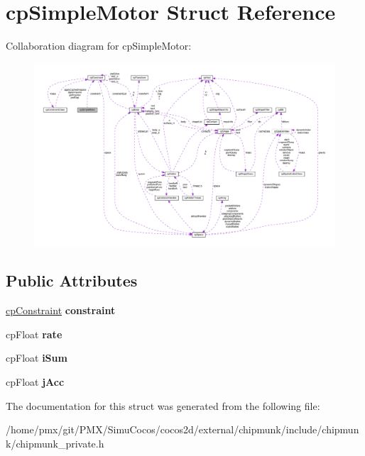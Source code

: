 \hypertarget{structcpSimpleMotor}{}\section{cp\+Simple\+Motor Struct Reference}
\label{structcpSimpleMotor}


Collaboration diagram for cp\+Simple\+Motor\+:
\nopagebreak
\begin{figure}[H]
\begin{center}
\leavevmode
\includegraphics[width=350pt]{structcpSimpleMotor__coll__graph}
\end{center}
\end{figure}
\subsection*{Public Attributes}
\begin{DoxyCompactItemize}
\item 
\mbox{\label{structcpSimpleMotor_a361cbe14d173459992b77702f9a94310}} 
\hyperlink{structcpConstraint}{cp\+Constraint} {\bfseries constraint}
\item 
\mbox{\label{structcpSimpleMotor_afca80c08d35ea3b62c740c855eb50116}} 
cp\+Float {\bfseries rate}
\item 
\mbox{\label{structcpSimpleMotor_adda289d079a35a95e84b45f62f046cae}} 
cp\+Float {\bfseries i\+Sum}
\item 
\mbox{\label{structcpSimpleMotor_ac1ff742b93d07fe04d1d6a9590415e68}} 
cp\+Float {\bfseries j\+Acc}
\end{DoxyCompactItemize}


The documentation for this struct was generated from the following file\+:\begin{DoxyCompactItemize}
\item 
/home/pmx/git/\+P\+M\+X/\+Simu\+Cocos/cocos2d/external/chipmunk/include/chipmunk/chipmunk\+\_\+private.\+h\end{DoxyCompactItemize}
